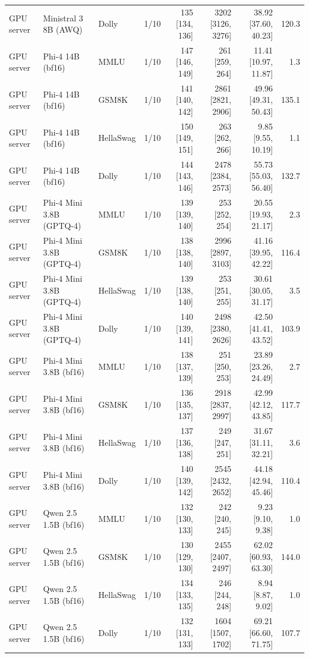 \begin{longtable}{@{}l l l c r r r r@{}}
GPU server & Ministral 3 8B (AWQ) & Dolly & 1/10 & 135 [134, 136] & 3202 [3126, 3276] & 38.92 [37.60, 40.23] & 120.3 \\
GPU server & Phi-4 14B (bf16) & MMLU & 1/10 & 147 [146, 149] & 261 [259, 264] & 11.41 [10.97, 11.87] & 1.3 \\
GPU server & Phi-4 14B (bf16) & GSM8K & 1/10 & 141 [140, 142] & 2861 [2821, 2906] & 49.96 [49.31, 50.43] & 135.1 \\
GPU server & Phi-4 14B (bf16) & HellaSwag & 1/10 & 150 [149, 151] & 263 [262, 266] & 9.85 [9.55, 10.19] & 1.1 \\
GPU server & Phi-4 14B (bf16) & Dolly & 1/10 & 144 [143, 146] & 2478 [2384, 2573] & 55.73 [55.03, 56.40] & 132.7 \\
GPU server & Phi-4 Mini 3.8B (GPTQ-4) & MMLU & 1/10 & 139 [139, 140] & 253 [252, 254] & 20.55 [19.93, 21.17] & 2.3 \\
GPU server & Phi-4 Mini 3.8B (GPTQ-4) & GSM8K & 1/10 & 138 [138, 140] & 2996 [2897, 3103] & 41.16 [39.95, 42.22] & 116.4 \\
GPU server & Phi-4 Mini 3.8B (GPTQ-4) & HellaSwag & 1/10 & 139 [138, 140] & 253 [251, 255] & 30.61 [30.05, 31.17] & 3.5 \\
GPU server & Phi-4 Mini 3.8B (GPTQ-4) & Dolly & 1/10 & 140 [139, 141] & 2498 [2380, 2626] & 42.50 [41.41, 43.52] & 103.9 \\
GPU server & Phi-4 Mini 3.8B (bf16) & MMLU & 1/10 & 138 [137, 139] & 251 [250, 253] & 23.89 [23.26, 24.49] & 2.7 \\
GPU server & Phi-4 Mini 3.8B (bf16) & GSM8K & 1/10 & 136 [135, 137] & 2918 [2837, 2997] & 42.99 [42.12, 43.85] & 117.7 \\
GPU server & Phi-4 Mini 3.8B (bf16) & HellaSwag & 1/10 & 137 [136, 138] & 249 [247, 251] & 31.67 [31.11, 32.21] & 3.6 \\
GPU server & Phi-4 Mini 3.8B (bf16) & Dolly & 1/10 & 140 [139, 142] & 2545 [2432, 2652] & 44.18 [42.94, 45.46] & 110.4 \\
GPU server & Qwen 2.5 1.5B (bf16) & MMLU & 1/10 & 132 [130, 133] & 242 [240, 245] & 9.23 [9.10, 9.38] & 1.0 \\
GPU server & Qwen 2.5 1.5B (bf16) & GSM8K & 1/10 & 130 [129, 130] & 2455 [2407, 2497] & 62.02 [60.93, 63.30] & 144.0 \\
GPU server & Qwen 2.5 1.5B (bf16) & HellaSwag & 1/10 & 134 [133, 135] & 246 [244, 248] & 8.94 [8.87, 9.02] & 1.0 \\
GPU server & Qwen 2.5 1.5B (bf16) & Dolly & 1/10 & 132 [131, 133] & 1604 [1507, 1702] & 69.21 [66.60, 71.75] & 107.7 \\

\end{longtable}
